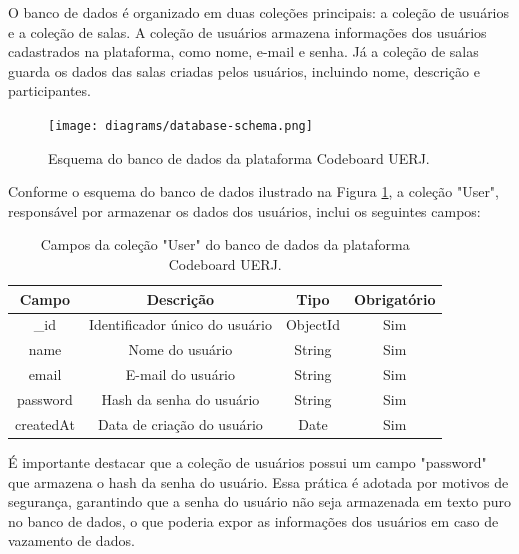 O banco de dados é organizado em duas coleções principais: a coleção de usuários e a coleção de salas. A coleção de usuários armazena informações dos usuários cadastrados na plataforma, como nome, e-mail e senha. Já a coleção de salas guarda os dados das salas criadas pelos usuários, incluindo nome, descrição e participantes.

\begin{figure}[H]
    \centering
    \texttt{[image: diagrams/database-schema.png]}
    \caption{Esquema do banco de dados da plataforma Codeboard UERJ.}
    \label{fig:database-schema}
\end{figure}

Conforme o esquema do banco de dados ilustrado na Figura \ref{fig:database-schema}, a coleção "User", responsável por armazenar os dados dos usuários, inclui os seguintes campos:

\begin{table}[H]
    \centering
    \renewcommand{\arraystretch}{1.3} 
    \begin{tabular}{|c|c|c|c|}
        \hline
        \textbf{Campo} & \textbf{Descrição}             & \textbf{Tipo} & \textbf{Obrigatório} \\
        \hline
        \_id           & Identificador único do usuário & ObjectId      & Sim                  \\
        \hline
        name           & Nome do usuário                & String        & Sim                  \\
        \hline
        email          & E-mail do usuário              & String        & Sim                  \\
        \hline
        password       & Hash da senha do usuário       & String        & Sim                  \\
        \hline
        createdAt      & Data de criação do usuário     & Date          & Sim                  \\
        \hline
    \end{tabular}
    \caption{Campos da coleção "User" do banco de dados da plataforma Codeboard UERJ.}
    \label{tab:user-collection-fields}
\end{table}

É importante destacar que a coleção de usuários possui um campo "password" que armazena o hash da senha do usuário. Essa prática é adotada por motivos de segurança, garantindo que a senha do usuário não seja armazenada em texto puro no banco de dados, o que poderia expor as informações dos usuários em caso de vazamento de dados.


